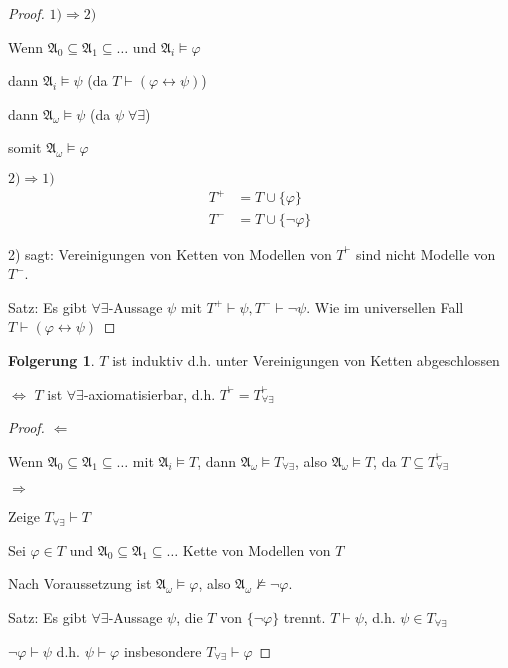 \documentclass[12pt,parskip=full]{scrartcl}
\newcommand{\heading}{\underline}
\theoremstyle{definition}
\newtheorem{corollary}[theorem]{Folgerung}
\begin{document}
	\begin{proof}
		\heading{$1) \Rightarrow 2)$}
		
		Wenn $\mathfrak{A}_0 \subseteq \mathfrak{A}_1 \subseteq \dots$ und $\mathfrak{A}_i \models \varphi$
		
		dann $\mathfrak{A}_i \models \psi$ (da $T \vdash (\varphi \leftrightarrow \psi)$)
		
		dann $\mathfrak{A}_\omega \models \psi$ (da $\psi \; \forall\exists$)
		
		somit $\mathfrak{A}_\omega \models \varphi$
		
		\heading{$2) \Rightarrow 1)$}
		\begin{align*}
			T^+ &= T \cup \{ \varphi \} \\
			T^- &= T \cup \{ \lnot \varphi \}
		\end{align*}
		
		2) sagt: Vereinigungen von Ketten von Modellen von $T^\vdash$ sind nicht Modelle von $T^-$.
		
		Satz: Es gibt $\forall\exists$-Aussage $\psi$ mit $T^+ \vdash \psi, T^- \vdash \lnot \psi$. Wie im universellen Fall $T \vdash (\varphi \leftrightarrow \psi)$
	\end{proof}

	\begin{corollary}
		$T$ ist induktiv d.h. unter Vereinigungen von Ketten abgeschlossen

		$\Leftrightarrow$ $T$ ist $\forall\exists$-axiomatisierbar, d.h. $T^\vdash = T_{\forall\exists}^\vdash$
	\end{corollary}

	\begin{proof}
		\heading{$\Leftarrow$}
		
		Wenn $\mathfrak{A}_0 \subseteq \mathfrak{A}_1 \subseteq \dots$ mit $\mathfrak{A}_i \models T$, dann $\mathfrak{A}_\omega \models T_{\forall\exists}$, also $\mathfrak{A}_\omega \models T$, da $T \subseteq T_{\forall\exists}^\vdash$
		
		\heading{$\Rightarrow$}
		
		Zeige $T_{\forall\exists} \vdash T$
		
		Sei $\varphi \in T$ und $\mathfrak{A}_0 \subseteq \mathfrak{A}_1 \subseteq \dots$ Kette von Modellen von $T$
		
		Nach Voraussetzung ist $\mathfrak{A}_\omega \models \varphi$, also $\mathfrak{A}_\omega \not\models \lnot \varphi$.
		
		Satz: Es gibt $\forall\exists$-Aussage $\psi$, die $T$ von $\{ \lnot \varphi \}$ trennt. $T \vdash \psi$, d.h. $\psi \in T_{\forall\exists}$
		
		$\lnot \varphi \vdash \psi$ d.h. $\psi \vdash \varphi$ insbesondere $T_{\forall\exists} \vdash \varphi$
	\end{proof}
\end{document}
